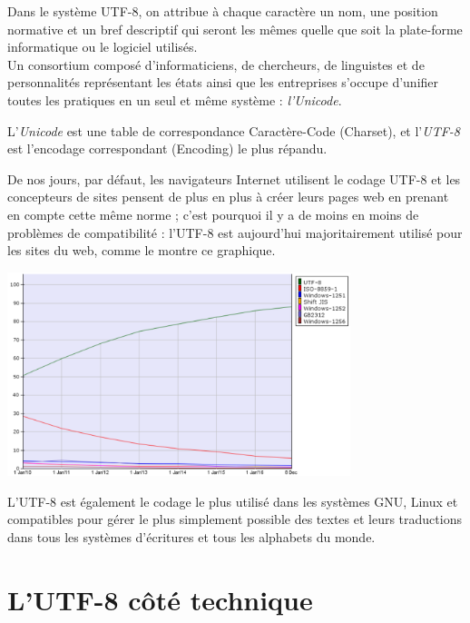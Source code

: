 Dans le système UTF-8, on attribue à chaque caractère un nom, une position normative et un bref descriptif qui seront les mêmes quelle que soit
la plate-forme informatique
ou le logiciel utilisés.\\
Un consortium composé d'informaticiens, de chercheurs, de linguistes et de personnalités représentant les états ainsi que les entreprises
s'occupe d'unifier toutes les pratiques en un seul et même système : \textit{l'Unicode}.\\

\begin{definition}
    L'\textit{Unicode}  est  une table de correspondance Caractère-Code (Charset), et l'\textit{UTF-8} est l'encodage correspondant (Encoding) le
    plus répandu.
\end{definition}

De nos jours, par défaut, les navigateurs Internet utilisent le codage UTF-8 et les concepteurs de sites pensent de plus en plus à créer leurs
pages web
en prenant en compte cette même norme ; c'est pourquoi il y a de moins en moins de problèmes de compatibilité : l'UTF-8 est aujourd'hui
majoritairement utilisé pour les sites du web, comme le montre ce graphique.

\begin{center}
    \includegraphics[width=10cm]{ch-texte/img/UTF8evol}
\end{center}

L'UTF-8 est également le codage le plus utilisé dans les systèmes GNU, Linux et compatibles pour gérer le plus simplement
possible des textes et leurs traductions dans tous les systèmes d'écritures et tous les alphabets du monde.\\

\section{L'UTF-8 côté technique}

